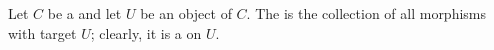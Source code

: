 \begin{definition} \label{definition:maximal_sieve_on_an_object_in_a_category}
    Let $C$ be a  and let $U$ be an object of $C$. 
    The  is the collection of all morphisms with target $U$; clearly, it is a  on $U$.
\end{definition}